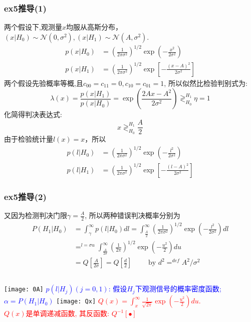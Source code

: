 \begin{frame}[shrink]
\frametitle{ex5推导(1)}
两个假设下,观测量$x$均服从高斯分布，$(x|H_0)\sim\mathcal{N}(0, \sigma^2), (x|H_1)\sim\mathcal{N}(A, \sigma^2)$.
\begin{align*}
p(x|H_0)&=\left(\frac{1}{2\pi\sigma^2}\right)^{1/2}\exp\left(-\frac{x^2}{2\sigma^2}\right)\\
p(x|H_1)&=\left(\frac{1}{2\pi\sigma^2}\right)^{1/2}\exp\left[-\frac{(x-A)^2}{2\sigma^2}\right]
\end{align*}
两个假设先验概率等概,且$c_{00}=c_{11}=0,c_{10}=c_{01}=1$, 所以似然比检验判别式为:
\[\lambda(x)=\frac{p(x|H_1)}{p(x|H_0)}=\exp\left(\frac{2Ax-A^2}{2\sigma^2}\right)\mathop{\gtrless}_{H_0}^{H_1}\eta=1 \]
化简得判决表达式:
\[x\mathop{\gtrless}_{H_0}^{H_1}\frac{A}{2} \]
由于检验统计量$l(x)=x$，所以
\begin{align*}
p(l|H_0)&=\left(\frac{1}{2\pi\sigma^2}\right)^{1/2}\exp\left(-\frac{l^2}{2\sigma^2}\right)\\
p(l|H_1)&=\left(\frac{1}{2\pi\sigma^2}\right)^{1/2}\exp\left[-\frac{(l-A)^2}{2\sigma^2}\right]
\end{align*}
\end{frame}

\begin{frame}[shrink]
\frametitle{ex5推导(2)}
又因为检测判决门限$\gamma=\frac{A}{2}$, 所以两种错误判决概率分别为
\begin{align*}
P(H_1|H_0)&=\int_{\gamma}^{\infty}p(l|H_0)dl=\int_{\frac{A}{2}}^{\infty}\left(\frac{1}{2\pi\sigma^2}\right)^{1/2}\exp\left(-\frac{l^2}{2\sigma^2}\right)dl\\
&\mathop{=}^{l=\sigma u}\int_{\frac{A}{2\sigma}}^{\infty}\left(\frac{1}{2\pi}\right)^{1/2}\exp\left(-\frac{u^2}{2}\right)du\\
&=Q[\frac{A}{2\sigma}]=Q[\frac{d}{2}] \qquad \text{ by } d^2\mathop{=}^{def}A^2/\sigma^2
\end{align*}
\begin{columns}
	\texttt{[image: 0A]}
	\scriptsize
	\textcolor{blue}{$p(l|H_j)(j=0,1)$: 假设$H_j$下观测信号的概率密度函数; $\alpha=P(H_1|H_0)$}
	\texttt{[image: Qx]}
	\scriptsize
	\textcolor{red}{$Q(x)=\int_{x}^{\infty}\frac{1}{\sqrt{2\pi}}\exp(-\frac{u^2}{2})du$.}\\
	\textcolor{red}{$Q(x)$是单调递减函数, 其反函数: $Q^{-1}[\bullet]$}
\end{columns}
\end{frame}

